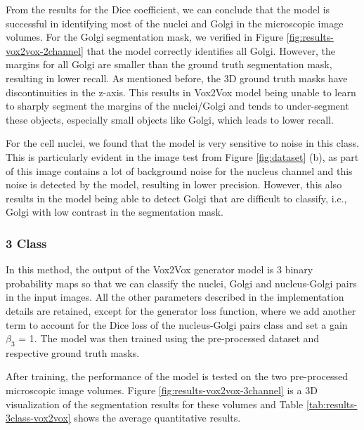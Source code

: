 From the results for the Dice coefficient, we can conclude that the model is successful in identifying most of the nuclei and Golgi in the microscopic image volumes. For the Golgi segmentation mask, we verified in Figure \ref{fig:results-vox2vox-2channel} that the model correctly identifies all Golgi. However, the margins for all Golgi are smaller than the ground truth segmentation mask, resulting in lower recall. As mentioned before, the \ac{3D} ground truth masks have discontinuities in the z-axis. This results in Vox2Vox model being unable to learn to sharply segment the margins of the nuclei/Golgi and tends to under-segment these objects, especially small objects like Golgi, which leads to lower recall.

For the cell nuclei, we found that the model is very sensitive to noise in this class. This is particularly evident in the image test from Figure \ref{fig:dataset} (b), as part of this image contains a lot of background noise for the nucleus channel and this noise is detected by the model, resulting in lower precision. However, this also results in the model being able to detect Golgi that are difficult to classify, i.e., Golgi with low contrast in the segmentation mask.


\subsubsection*{3 Class}
In this method, the output of the Vox2Vox generator model is 3 binary probability maps so that we can classify the nuclei, Golgi and nucleus-Golgi pairs in the input images. All the other parameters described in the implementation details are retained, except for the generator loss function, where we add another term to account for the Dice loss of the nucleus-Golgi pairs class and set a gain $\beta_3$ = 1. The model was then trained using the pre-processed dataset and respective ground truth masks.

After training, the performance of the model is tested on the two pre-processed microscopic image volumes. Figure \ref{fig:results-vox2vox-3channel} is a \ac{3D} visualization of the segmentation results for these volumes and Table \ref{tab:results-3class-vox2vox} shows the average quantitative results.

\begin{table}[!htb]
\centering
\caption{Average metric values obtained from testing the 3 class Vox2Vox model on two pre-processed microscopic images.}
\label{tab:results-3class-vox2vox}
\end{table}

